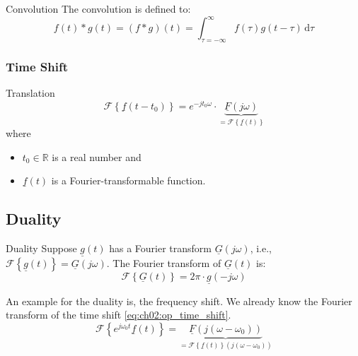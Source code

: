 \begin{refsection}
\begin{excursus}{Convolution}
	The convolution is defined to:
	\begin{equation}
		f(t) * g(t) = \left(f * g\right) (t) = \int_{\tau = -\infty}^{\infty} f(\tau) g(t - \tau) \, \mathrm{d} \tau
		\label{eq:ch02:def_convolution}
	\end{equation}
\end{excursus}

\subsubsection{Time Shift}


\begin{definition}{Translation}
	\begin{equation}
		\mathcal{F}\left\{\underline{f}(t - t_0)\right\} = e^{-j t_0 \omega} \cdot \underbrace{\underline{F} \left(j \omega\right)}_{= \mathcal{F}\left\{\underline{f}(t)\right\}}
		\label{eq:ch02:op_time_shift}
	\end{equation}
	where
	\begin{itemize}
		\item $t_0 \in \mathbb{R}$ is a real number and
		\item $\underline{f}(t)$ is a Fourier-transformable function.
	\end{itemize}
\end{definition}

\subsection{Duality}

\begin{definition}{Duality}
	Suppose $\underline{g}(t)$ has a Fourier transform $\underline{G}\left(j \omega\right)$, i.e., $\mathcal{F}\left\{\underline{g}(t)\right\} = \underline{G}\left(j \omega\right)$. The Fourier transform of $\underline{G}(t)$ is:
	\begin{equation}
		\mathcal{F}\left\{\underline{G}(t)\right\} = 2 \pi \cdot \underline{g} \left(- j \omega\right)
		\label{eq:ch02:op_duality}
	\end{equation}
\end{definition}

An example for the duality is, the frequency shift. We already know the Fourier transform of the time shift \eqref{eq:ch02:op_time_shift}.
\begin{equation}
	\mathcal{F}\left\{e^{j \omega_0 t} \underline{f}(t)\right\} = \underbrace{\underline{F} \left(j (\omega - \omega_0)\right)}_{= \mathcal{F}\left\{\underline{f}(t)\right\} \left( j (\omega - \omega_0) \right)}
	\label{eq:ch02:op_freq_shift}
\end{equation}


\end{refsection}
